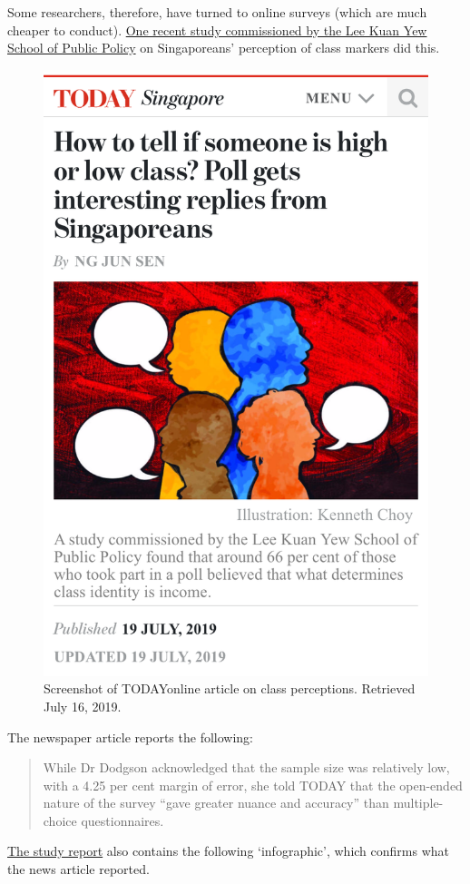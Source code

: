 \documentclass[openany]{book}
\begin{document}
Some researchers, therefore, have turned to online surveys (which are
much cheaper to conduct).
\href{https://lkyspp.nus.edu.sg/docs/default-source/gia-documents/cars_-condos-and-cai-png-survey-(high-res).pdf}{One
recent study commissioned by the Lee Kuan Yew School of Public Policy}
on Singaporeans' perception of class markers did this.

\begin{figure}

{\centering \includegraphics[width=0.5\linewidth]{images/samples/today_classpercept} 

}

\caption{Screenshot of TODAYonline article on class perceptions. Retrieved July 16, 2019.}\label{fig:today-classmarkers}
\end{figure}

The newspaper article reports the following:

\begin{quote}
While Dr Dodgson acknowledged that the sample size was relatively low,
with a 4.25 per cent margin of error, she told TODAY that the open-ended
nature of the survey ``gave greater nuance and accuracy'' than
multiple-choice questionnaires.
\end{quote}

\href{https://lkyspp.nus.edu.sg/docs/default-source/gia-documents/cars_-condos-and-cai-png-survey-(high-res).pdf}{The
study report} also contains the following `infographic', which confirms
what the news article reported.
\end{document}
